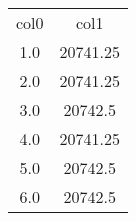 \begin{table}
\begin{tabular}{cc}
col0 & col1 \\
1.0 & 20741.25 \\
2.0 & 20741.25 \\
3.0 & 20742.5 \\
4.0 & 20741.25 \\
5.0 & 20742.5 \\
6.0 & 20742.5 \\
\end{tabular}
\end{table}
